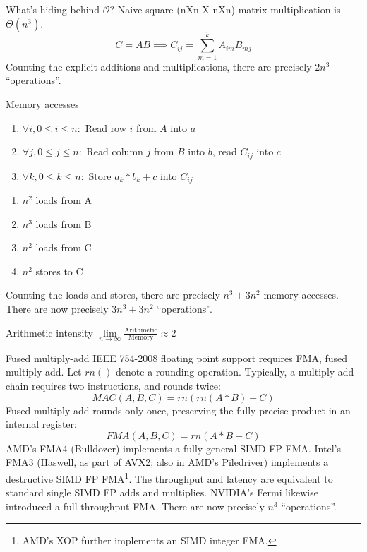 \documentclass[mathserif,xcolor={dvipsnames,table}]{beamer}
\begin{document}
\begin{frame}{What's hiding behind $\mathcal{O}$?}
Naive square (nXn X nXn) matrix multiplication is $\Theta(n^{3})$.
\vfill
\begin{equation}
C = AB \implies C_{ij} = \sum\limits_{m=1}^{k} A_{im}B_{mj}
\end{equation}
\vfill
Counting the explicit additions and multiplications, there are
precisely $2n^{3}$ ``operations''.
\end{frame}

\begin{frame}{Memory accesses}
\begin{enumerate}
\item $\forall i, 0\le i \le n:$ Read row $i$ from $A$ into $a$
\item $\forall j, 0\le j \le n:$ Read column $j$ from $B$ into $b$, read $C_{ij}$ into $c$
\item $\forall k, 0\le k \le n:$ Store $a_k * b_k + c$ into $C_{ij}$
\end{enumerate}
\vfill
\begin{enumerate}
\item $n^{2}$ loads from A
\item $n^{3}$ loads from B
\item $n^{2}$ loads from C
\item $n^{2}$ stores to C
\end{enumerate}
Counting the loads and stores, there are precisely $n^{3} + 3n^{2}$ memory
accesses. There are now precisely $3n^{3} + 3n^{2}$ ``operations''.
\vfill
\begin{alertblock}{Arithmetic intensity}
\center$\lim\limits_{n \to \infty} \frac{\text{Arithmetic}}{\text{Memory}}\approx 2$
\end{alertblock}
\vfill
\end{frame}

\begin{frame}{Fused multiply-add}
\small{
IEEE 754-2008 floating point support requires FMA, fused multiply-add.
Let $rn()$ denote a rounding operation. Typically, a multiply-add chain
requires two instructions, and rounds twice:
\begin{equation}
MAC(A,B,C) = rn(rn(A * B) + C)
\end{equation}
Fused multiply-add rounds only once, preserving the fully precise product in
an internal register:
\begin{equation}
FMA(A,B,C) = rn(A * B + C)
\end{equation}
AMD's FMA4 (Bulldozer) implements a fully general SIMD FP FMA. Intel's FMA3
(Haswell, as part of AVX2; also in AMD's Piledriver) implements a destructive
SIMD FP FMA\footnote{AMD's XOP further implements an SIMD integer FMA.}.
The throughput and latency are equivalent to standard single SIMD FP adds and
multiplies. NVIDIA's Fermi likewise introduced a full-throughput FMA.
\vfill
There are now precisely $n^{3}$ ``operations''.
}
\end{frame}
\end{document}
